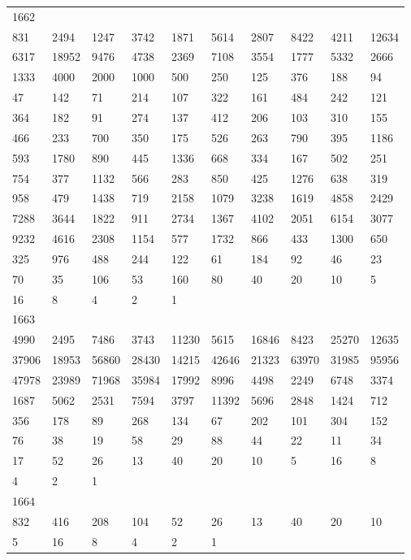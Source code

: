 \begin{longtable}{*{10}{l}}
1662&&&&&&&&&\\
831& 2494& 1247& 3742& 1871& 5614& 2807& 8422& 4211& 12634\\
6317& 18952& 9476& 4738& 2369& 7108& 3554& 1777& 5332& 2666\\
1333& 4000& 2000& 1000& 500& 250& 125& 376& 188& 94\\
47& 142& 71& 214& 107& 322& 161& 484& 242& 121\\
364& 182& 91& 274& 137& 412& 206& 103& 310& 155\\
466& 233& 700& 350& 175& 526& 263& 790& 395& 1186\\
593& 1780& 890& 445& 1336& 668& 334& 167& 502& 251\\
754& 377& 1132& 566& 283& 850& 425& 1276& 638& 319\\
958& 479& 1438& 719& 2158& 1079& 3238& 1619& 4858& 2429\\
7288& 3644& 1822& 911& 2734& 1367& 4102& 2051& 6154& 3077\\
9232& 4616& 2308& 1154& 577& 1732& 866& 433& 1300& 650\\
325& 976& 488& 244& 122& 61& 184& 92& 46& 23\\
70& 35& 106& 53& 160& 80& 40& 20& 10& 5\\
16& 8& 4& 2& 1& \\

1663&&&&&&&&&\\
4990& 2495& 7486& 3743& 11230& 5615& 16846& 8423& 25270& 12635\\
37906& 18953& 56860& 28430& 14215& 42646& 21323& 63970& 31985& 95956\\
47978& 23989& 71968& 35984& 17992& 8996& 4498& 2249& 6748& 3374\\
1687& 5062& 2531& 7594& 3797& 11392& 5696& 2848& 1424& 712\\
356& 178& 89& 268& 134& 67& 202& 101& 304& 152\\
76& 38& 19& 58& 29& 88& 44& 22& 11& 34\\
17& 52& 26& 13& 40& 20& 10& 5& 16& 8\\
4& 2& 1& \\

1664&&&&&&&&&\\
832& 416& 208& 104& 52& 26& 13& 40& 20& 10\\
5& 16& 8& 4& 2& 1& \\


\end{longtable}
